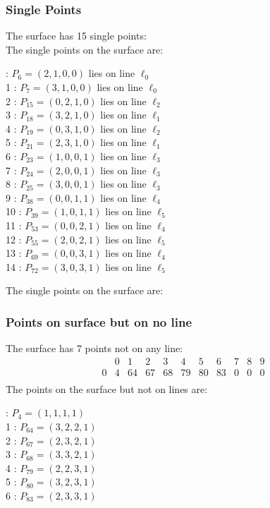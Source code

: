 \documentclass{article}
\begin{document}
{\subsubsection*{Single Points}
The surface has 15 single points:\\
The single points on the surface are:\\
\begin{multicols}{2}
 : $P_{6}=( 2, 1, 0, 0 )$ lies on line $\ell_{0}$\\
1 : $P_{7}=( 3, 1, 0, 0 )$ lies on line $\ell_{0}$\\
2 : $P_{15}=( 0, 2, 1, 0 )$ lies on line $\ell_{2}$\\
3 : $P_{18}=( 3, 2, 1, 0 )$ lies on line $\ell_{1}$\\
4 : $P_{19}=( 0, 3, 1, 0 )$ lies on line $\ell_{2}$\\
5 : $P_{21}=( 2, 3, 1, 0 )$ lies on line $\ell_{1}$\\
6 : $P_{23}=( 1, 0, 0, 1 )$ lies on line $\ell_{3}$\\
7 : $P_{24}=( 2, 0, 0, 1 )$ lies on line $\ell_{3}$\\
8 : $P_{25}=( 3, 0, 0, 1 )$ lies on line $\ell_{3}$\\
9 : $P_{38}=( 0, 0, 1, 1 )$ lies on line $\ell_{4}$\\
10 : $P_{39}=( 1, 0, 1, 1 )$ lies on line $\ell_{5}$\\
11 : $P_{53}=( 0, 0, 2, 1 )$ lies on line $\ell_{4}$\\
12 : $P_{55}=( 2, 0, 2, 1 )$ lies on line $\ell_{5}$\\
13 : $P_{69}=( 0, 0, 3, 1 )$ lies on line $\ell_{4}$\\
14 : $P_{72}=( 3, 0, 3, 1 )$ lies on line $\ell_{5}$\\
\end{multicols}
The single points on the surface are:\\
\subsubsection*{Points on surface but on no line}
The surface has 7 points not on any line:\\
$$
\begin{array}{r|*{10}{r}}
 & 0 & 1 & 2 & 3 & 4 & 5 & 6 & 7 & 8 & 9\\
\hline
0 & 4 & 64 & 67 & 68 & 79 & 80 & 83 & 0 & 0 & 0\\
\end{array}
$$
The points on the surface but not on lines are:\\
\begin{multicols}{2}
 : $P_{4}=( 1, 1, 1, 1 )$\\
1 : $P_{64}=( 3, 2, 2, 1 )$\\
2 : $P_{67}=( 2, 3, 2, 1 )$\\
3 : $P_{68}=( 3, 3, 2, 1 )$\\
4 : $P_{79}=( 2, 2, 3, 1 )$\\
5 : $P_{80}=( 3, 2, 3, 1 )$\\
6 : $P_{83}=( 2, 3, 3, 1 )$\\
\end{multicols}
}
\end{document}
